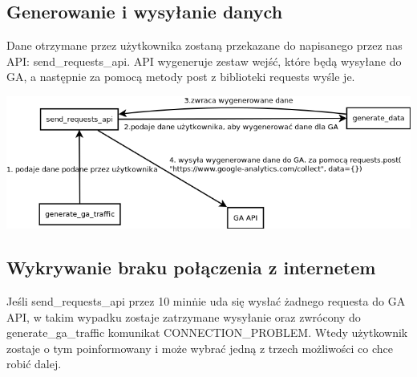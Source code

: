 \documentclass{article}
\begin{document}
\subsection{Generowanie i wysyłanie danych}
Dane otrzymane przez użytkownika zostaną przekazane do napisanego przez nas API: send\_requests\_api. API wygeneruje zestaw wejść, które będą wysyłane do GA, a następnie za pomocą metody post z biblioteki requests wyśle je. 

\includegraphics[scale=0.5]{connection_ga}

\subsection{Wykrywanie braku połączenia z internetem}
Jeśli send\_requests\_api przez 10 min\. nie uda się wysłać żadnego requesta do GA API, w takim wypadku zostaje zatrzymane wysyłanie oraz zwrócony do generate\_ga\_traffic komunikat CONNECTION\_PROBLEM\@. Wtedy użytkownik zostaje o tym poinformowany i może wybrać jedną z trzech możliwości co chce robić dalej.
\end{document}
